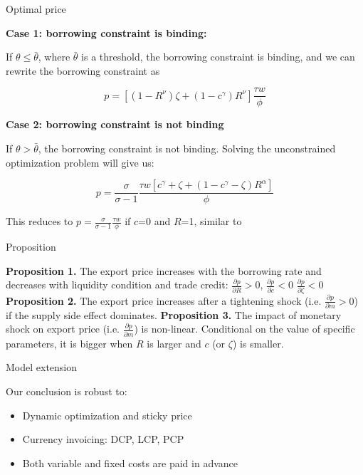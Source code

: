 \documentclass[10pt]{beamer}
\begin{document}
\begin{frame}{Optimal price}

\textbf{Case 1: borrowing constraint is binding: }

If $\theta\leq\bar{\theta}$, where $\bar{\theta}$ is a threshold, the borrowing constraint is binding, and we can rewrite the borrowing constraint as 

\begin{equation}
p=[(1-R^{\nu})\zeta+(1-c^\gamma)R^{\nu}] \frac{\tau w}{\phi}
\end{equation}

\textbf{Case 2: borrowing constraint is not binding}

If $\theta>\bar{\theta}$, the borrowing constraint is not binding. Solving the unconstrained optimization problem will give us:

\begin{equation}
p=\frac{\sigma}{\sigma-1}\frac{\tau w [c^\gamma+\zeta+(1-c^\gamma-\zeta) R^\alpha]}{\phi}
\end{equation}

This reduces to $p=\frac{\sigma}{\sigma-1}\frac{\tau w}{\phi}$ if $c$=0 and $R$=1, similar to \cite{melitz2003impact} 

\end{frame}


\begin{frame}[label=Proposition]{Proposition}

\textbf{Proposition 1.} The export price increases with the borrowing rate and decreases with liquidity condition and trade credit: $\frac{\partial p}{\partial R}>0$, $\frac{\partial p}{\partial c}<0$ $\frac{\partial p}{\partial \zeta}<0$
\vfill
\textbf{Proposition 2.} The export price increases after a tightening shock (i.e. $\frac{\partial p}{\partial m}>0$) if the supply side effect dominates.
\hyperlink{proof}{}
\vfill
\textbf{Proposition 3.} The impact of monetary shock on export price (i.e. $\frac{\partial p}{\partial m}$) is non-linear. Conditional on the value of specific parameters, it is bigger when $R$ is larger and $c$ (or $\zeta$) is smaller.

\end{frame}



\begin{frame}[label=model_extension]{Model extension}
\fontsize{11}{11}\selectfont

Our conclusion is robust to:
\medskip

\begin{itemize}
    \item Dynamic optimization and sticky price
    \medskip
    \item Currency invoicing: DCP, LCP, PCP
    \medskip
    \item Both variable and fixed costs are paid in advance
\end{itemize}

\hyperlink{appendix_model_extension}{}

\end{frame}
\end{document}

